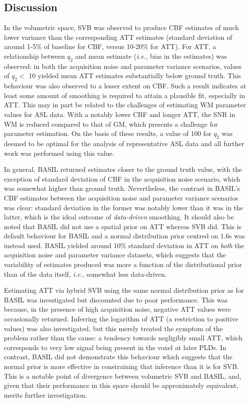 \subsection{Discussion}

In the volumetric space, SVB was observed to produce CBF estimates of much lower variance than the corresponding ATT estimates (standard deviation of around 1-5\% of baseline for CBF, versus 10-20\% for ATT). For ATT, a relationship between $q_2$ and mean estimate (\textit{i.e.}, bias in the estimates) was observed: in both the acquisition noise and parameter variance scenarios, values of $q_2 <$ 10 yielded mean ATT estimates substantially below ground truth. This behaviour was also observed to a lesser extent on CBF. Such a result indicates at least some amount of smoothing is required to attain a plausible fit, especially in ATT. This may in part be related to the challenges of estimating WM parameter values for ASL data. With a notably lower CBF and longer ATT, the SNR in WM is reduced compared to that of GM, which presents a challenge for parameter estimation. On the basis of these results, a value of 100 for $q_2$ was deemed to be optimal for the analysis of representative ASL data and all further work was performed using this value. 

In general, BASIL returned estimates closer to the ground truth value, with the exception of standard deviation of CBF in the acquisition noise scenario, which was somewhat higher than ground truth. Nevertheless, the contrast in BASIL's CBF estimates between the acquisition noise and parameter variance scenarios was clear: standard deviation in the former was notably lower than it was in the latter, which is the ideal outcome of \textit{data-driven} smoothing. It should also be noted that BASIL did not use a spatial prior on ATT whereas SVB did. This is default behaviour for BASIL and a normal distribution prior centred on 1.6s was instead used. BASIL yielded around 10\% standard deviation in ATT on \textit{both} the acquisition noise and parameter variance datasets, which suggests that the variability of estimates produced was more a function of the distributional prior than of the data itself, \textit{i.e.}, somewhat less data-driven. 

Estimating ATT via hybrid SVB using the same normal distribution prior as for BASIL was investigated but discounted due to poor performance. This was because, in the presence of high acquisition noise, negative ATT values were occasionally returned. Inferring the logarithm of ATT (a restriction to positive values) was also investigated, but this merely treated the symptom of the problem rather than the cause: a tendency towards negligibly small ATT, which corresponds to very low signal being present in the voxel at later PLDs. In contrast, BASIL did not demonstrate this behaviour which suggests that the normal prior is more effective in constraining that inference than it is for SVB. This is a notable point of divergence between volumetric SVB and BASIL, and, given that their performance in this space should be approximately equivalent, merits further investigation. 

